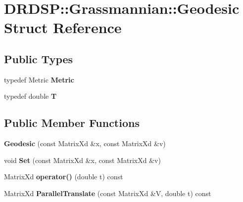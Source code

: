 \hypertarget{struct_d_r_d_s_p_1_1_grassmannian_1_1_geodesic}{\section{D\-R\-D\-S\-P\-:\-:Grassmannian\-:\-:Geodesic Struct Reference}
\label{struct_d_r_d_s_p_1_1_grassmannian_1_1_geodesic}
}
\subsection*{Public Types}
\begin{DoxyCompactItemize}
\item 
\hypertarget{struct_d_r_d_s_p_1_1_grassmannian_1_1_geodesic_a4a0b6eae3786b1332a7d952124be1149}{typedef Metric {\bfseries Metric}}\label{struct_d_r_d_s_p_1_1_grassmannian_1_1_geodesic_a4a0b6eae3786b1332a7d952124be1149}

\item 
\hypertarget{struct_d_r_d_s_p_1_1_grassmannian_1_1_geodesic_a12af6f271811ddd9a4cf823d289adc87}{typedef double {\bfseries T}}\label{struct_d_r_d_s_p_1_1_grassmannian_1_1_geodesic_a12af6f271811ddd9a4cf823d289adc87}

\end{DoxyCompactItemize}
\subsection*{Public Member Functions}
\begin{DoxyCompactItemize}
\item 
\hypertarget{struct_d_r_d_s_p_1_1_grassmannian_1_1_geodesic_a035d24bba97ef7529ac731eb28ad3a0f}{{\bfseries Geodesic} (const Matrix\-Xd \&x, const Matrix\-Xd \&v)}\label{struct_d_r_d_s_p_1_1_grassmannian_1_1_geodesic_a035d24bba97ef7529ac731eb28ad3a0f}

\item 
\hypertarget{struct_d_r_d_s_p_1_1_grassmannian_1_1_geodesic_ab0ea4c98f06efd4350b46cea5ab473e9}{void {\bfseries Set} (const Matrix\-Xd \&x, const Matrix\-Xd \&v)}\label{struct_d_r_d_s_p_1_1_grassmannian_1_1_geodesic_ab0ea4c98f06efd4350b46cea5ab473e9}

\item 
\hypertarget{struct_d_r_d_s_p_1_1_grassmannian_1_1_geodesic_add97940011312bc74f12537afcfb81ea}{Matrix\-Xd {\bfseries operator()} (double t) const }\label{struct_d_r_d_s_p_1_1_grassmannian_1_1_geodesic_add97940011312bc74f12537afcfb81ea}

\item 
\hypertarget{struct_d_r_d_s_p_1_1_grassmannian_1_1_geodesic_afefc339d1c141b89794e59fa0c4237a9}{Matrix\-Xd {\bfseries Parallel\-Translate} (const Matrix\-Xd \&V, double t) const }\label{struct_d_r_d_s_p_1_1_grassmannian_1_1_geodesic_afefc339d1c141b89794e59fa0c4237a9}

\end{DoxyCompactItemize}

